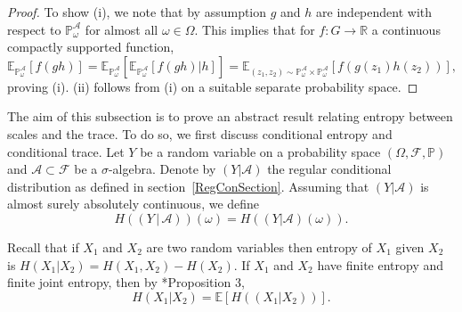 \documentclass[10pt, english,oneside,reqno]{amsart}
\theoremstyle{plain}
\newtheorem{definition}[theorem]{Definition}
\theoremstyle{remark}
\numberwithin{equation}{section}
\numberwithin{figure}{section}
\newcommand{\R}{\mathbb{R}}
\newcommand{\E}{\mathbb{E}}
\begin{document}
\begin{proof}
    To show (i), we note that by assumption $g$ and $h$ are independent with respect to $\mathbb{P}_{\omega}^{\mathscr{A}}$ for almost all $\omega \in \Omega$. This implies that for $f: G \to \R$ a continuous compactly supported function, $$\E_{\mathbb{P}_{\omega}^{\mathscr{A}}}[f(gh)] = \E_{\mathbb{P}_{\omega}^{\mathscr{A}}}[\E_{\mathbb{P}_{\omega}^{\mathscr{A}}}[f(gh)|h]] = \E_{(z_1,z_2) \sim \mathbb{P}_{\omega}^{\mathscr{A}} \times \mathbb{P}_{\omega}^{\mathscr{A}}}[f(g(z_1)h(z_2))],$$ proving (i). (ii) follows from (i) on a suitable separate probability space. 
\end{proof}

The aim of this subsection is to prove an abstract result relating entropy between scales and the trace. To do so, we first discuss conditional entropy and conditional trace. Let $Y$ be a random variable on a probability space $(\Omega, \mathscr{F}, \mathbb{P})$ and $\mathscr{A} \subset \mathscr{F}$ be a $\sigma$-algebra. Denote by $(Y|\mathscr{A})$ the regular conditional distribution as defined in section~\ref{RegConSection}. Assuming that $(Y|\mathscr{A})$ is almost surely absolutely continuous, we define $$H((Y \,|\, \mathscr{A}))(\omega) = H((Y|\mathscr{A})(\omega)).$$ 

Recall that if $X_1$ and $X_2$ are two random variables then entropy of $X_1$ given $X_2$ is $H(X_1|X_2) = H(X_1, X_2) - H(X_2).$ If $X_1$ and $X_2$ have finite entropy and finite joint entropy, then by \cite{Vignaux2021}*{Proposition 3},
\begin{equation}\label{ConditionalVarianceExpectation}
    H(X_1|X_2) = \mathbb{E}[H((X_1|X_2))].
\end{equation}




\end{document}
